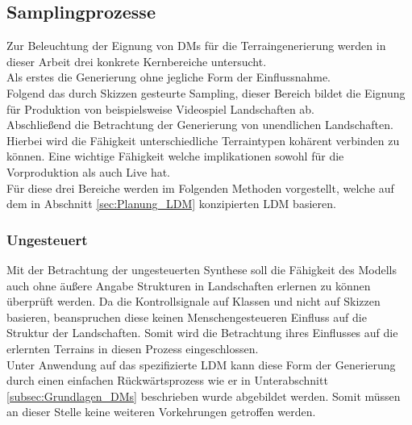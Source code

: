 
\subsection {Samplingprozesse}

Zur Beleuchtung der Eignung von DMs für die Terraingenerierung werden in dieser Arbeit drei konkrete Kernbereiche untersucht. \\
Als erstes die Generierung ohne jegliche Form der Einflussnahme. \\
Folgend das durch Skizzen gesteurte Sampling, dieser Bereich bildet die Eignung für Produktion von beispielsweise Videospiel Landschaften ab. \\
Abschließend die Betrachtung der Generierung von unendlichen Landschaften. Hierbei wird die Fähigkeit unterschiedliche Terraintypen kohärent verbinden zu können. Eine wichtige Fähigkeit welche implikationen sowohl für die Vorproduktion als auch Live hat. \\
Für diese drei Bereiche werden im Folgenden Methoden vorgestellt, welche auf dem in Abschnitt \ref{sec:Planung_LDM} konzipierten LDM basieren. 


\subsubsection {Ungesteuert}

Mit der Betrachtung der ungesteuerten Synthese soll die Fähigkeit des Modells auch ohne äußere Angabe Strukturen in Landschaften erlernen zu können überprüft werden. Da die Kontrollsignale auf Klassen und nicht auf Skizzen basieren, beanspruchen diese keinen Menschengesteueren Einfluss auf die Struktur der Landschaften. Somit wird die Betrachtung ihres Einflusses auf die erlernten Terrains in diesen Prozess eingeschlossen. \\
Unter Anwendung auf das spezifizierte LDM kann diese Form der Generierung durch einen einfachen Rückwärtsprozess wie er in Unterabschnitt \ref{subsec:Grundlagen_DMs} beschrieben wurde abgebildet werden. Somit müssen an dieser Stelle keine weiteren Vorkehrungen getroffen werden. 



